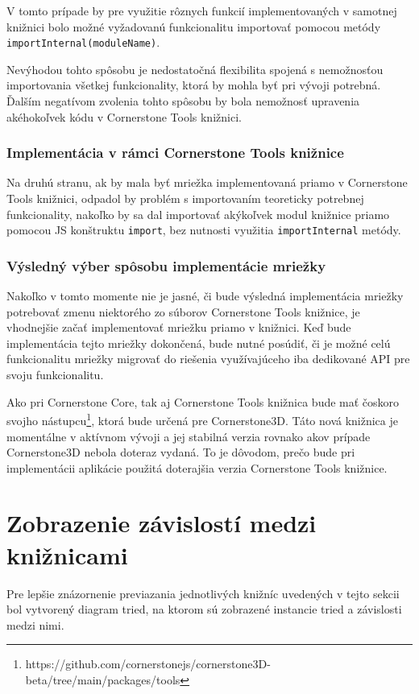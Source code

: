 V tomto prípade by pre využitie rôznych funkcií implementovaných v samotnej knižnici bolo možné vyžadovanú funkcionalitu importovať pomocou metódy \texttt{importInternal(moduleName)}.

Nevýhodou tohto spôsobu je nedostatočná flexibilita spojená s nemožnosťou importovania všetkej funkcionality, ktorá by mohla byť pri vývoji potrebná. Ďalším negatívom zvolenia tohto spôsobu by bola nemožnosť upravenia akéhokoľvek kódu v Cornerstone Tools knižnici.

\subsubsection {Implementácia v rámci Cornerstone Tools knižnice}
Na druhú stranu, ak by mala byť mriežka implementovaná priamo v Cornerstone Tools knižnici, odpadol by problém s importovaním teoreticky potrebnej funkcionality, nakoľko by sa dal importovať akýkoľvek modul knižnice priamo pomocou JS konštruktu \texttt{import}, bez nutnosti využitia \texttt{importInternal} metódy.

\subsubsection {Výsledný výber spôsobu implementácie mriežky}
Nakoľko v tomto momente nie je jasné, či bude výsledná implementácia mriežky potrebovať zmenu niektorého zo súborov Cornerstone Tools knižnice, je vhodnejšie začať implementovať mriežku priamo v knižnici. Keď bude implementácia tejto mriežky dokončená, bude nutné posúdiť, či je možné celú funkcionalitu mriežky migrovať do riešenia využívajúceho iba dedikované API pre svoju funkcionalitu.

Ako pri Cornerstone Core, tak aj Cornerstone Tools knižnica bude mať čoskoro svojho nástupcu\footnote{https://github.com/cornerstonejs/cornerstone3D-beta/tree/main/packages/tools}, ktorá bude určená pre Cornerstone3D. Táto nová knižnica je momentálne v aktívnom vývoji a jej stabilná verzia rovnako ako\newline v prípade Cornerstone3D nebola doteraz vydaná. To je dôvodom, prečo bude pri implementácii aplikácie použitá doterajšia verzia Cornerstone Tools knižnice.

\clearpage

\section {Zobrazenie závislostí medzi knižnicami}\label{dependency_graph}
Pre lepšie znázornenie previazania jednotlivých knižníc uvedených v tejto sekcii bol vytvorený diagram tried, na ktorom sú zobrazené instancie tried a závislosti medzi nimi.

